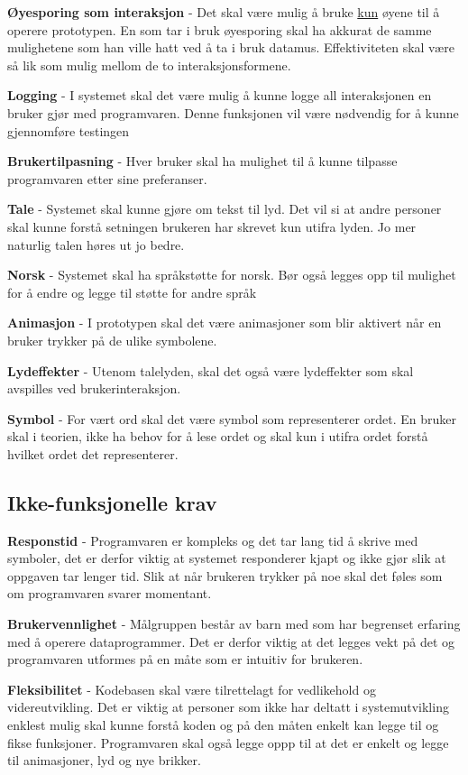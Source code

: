  
\textbf{Øyesporing som interaksjon} - Det skal være mulig å bruke \underline{kun} øyene til å operere prototypen. En som tar i bruk øyesporing skal ha akkurat de samme mulighetene som han ville hatt ved å ta i bruk datamus. Effektiviteten skal være så lik som mulig mellom de to interaksjonsformene. 
 
\textbf{Logging} - I systemet skal det være mulig å kunne logge all interaksjonen en bruker gjør med programvaren. Denne funksjonen vil være nødvendig for å kunne gjennomføre testingen 
 
\textbf{Brukertilpasning} - Hver bruker skal ha mulighet til å kunne tilpasse programvaren etter sine preferanser. 
  
\textbf{Tale} - Systemet skal kunne gjøre om tekst til lyd. Det vil si at andre personer skal kunne forstå setningen brukeren har skrevet kun utifra lyden. Jo mer naturlig talen høres ut jo bedre.
  
\textbf{Norsk} - Systemet skal ha språkstøtte for norsk. Bør også legges opp til mulighet for å endre og legge til støtte for andre språk 
 
\textbf{Animasjon} - I prototypen skal det være animasjoner som blir aktivert når en bruker trykker på de ulike symbolene.  

\textbf{Lydeffekter} - Utenom talelyden, skal det også være lydeffekter som skal avspilles ved brukerinteraksjon.  
 
\textbf{Symbol} - For vært ord skal det være symbol som representerer ordet. En bruker skal i teorien, ikke ha behov for å lese ordet og skal kun i utifra ordet forstå hvilket ordet det representerer. 


 
\subsection{Ikke-funksjonelle krav} 
 
 
\textbf{Responstid} -  Programvaren er kompleks og det tar lang tid å skrive med symboler, det er derfor viktig at systemet responderer kjapt og ikke gjør slik at oppgaven tar lenger tid. Slik at når brukeren trykker på noe skal det føles som om programvaren svarer momentant. 
 
 
\textbf{Brukervennlighet} - Målgruppen består av barn med som har begrenset erfaring med å operere dataprogrammer. Det er derfor viktig at det legges vekt på det og programvaren utformes på en måte som er intuitiv for brukeren.   
 
 
\textbf{Fleksibilitet} - Kodebasen skal være tilrettelagt for vedlikehold og videreutvikling. Det er viktig at personer som ikke har deltatt i systemutvikling enklest mulig skal kunne forstå koden og på den måten enkelt kan legge til og fikse funksjoner. Programvaren skal også legge oppp til at det er enkelt og legge til animasjoner, lyd og nye brikker. 
 
